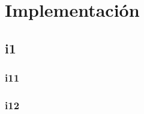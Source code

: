 \chapter{Implementación}
\thispagestyle{empty}

\section{i1}

\subsection{i11}


\newpage
\subsection{i12}

